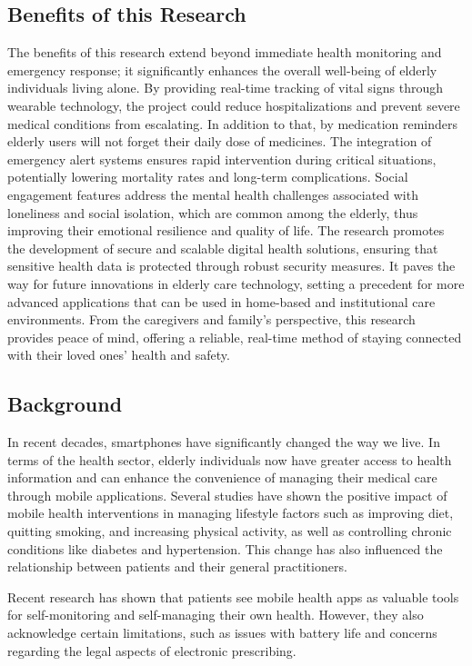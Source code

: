 \documentclass[a4paper, 12pt]{article}
\begin{document}
\subsection{\textbf{\Large Benefits of this Research}}

The benefits of this research extend beyond immediate health monitoring and emergency response; it significantly enhances the overall well-being of elderly individuals living alone. By providing real-time tracking of vital signs through wearable technology, the project could reduce hospitalizations and prevent severe medical conditions from escalating. In addition to that, by medication reminders elderly users will not forget their daily dose of medicines.
The integration of emergency alert systems ensures rapid intervention during critical situations, potentially lowering mortality rates and long-term complications. Social engagement features address the mental health challenges associated with loneliness and social isolation, which are common among the elderly, thus improving their emotional resilience and quality of life.
The research promotes the development of secure and scalable digital health solutions, ensuring that sensitive health data is protected through robust security measures. It paves the way for future innovations in elderly care technology, setting a precedent for more advanced applications that can be used in home-based and institutional care environments. From the caregivers and family’s perspective, this research provides peace of mind, offering a reliable, real-time method of staying connected with their loved ones' health and safety.

\subsection{\textbf{\Large Background}}

In recent decades, smartphones have significantly changed the way we live. In terms of the health sector, elderly individuals now have greater access to health information and can enhance the convenience of managing their medical care through mobile applications. Several studies have shown the positive impact of mobile health interventions in managing lifestyle factors such as improving diet, quitting smoking, and increasing physical activity, as well as controlling chronic conditions like diabetes and hypertension. This change has also influenced the relationship between patients and their general practitioners.

Recent research has shown that patients see mobile health apps as valuable tools for self-monitoring and self-managing their own health. However, they also acknowledge certain limitations, such as issues with battery life and concerns regarding the legal aspects of electronic prescribing.
\end{document}
